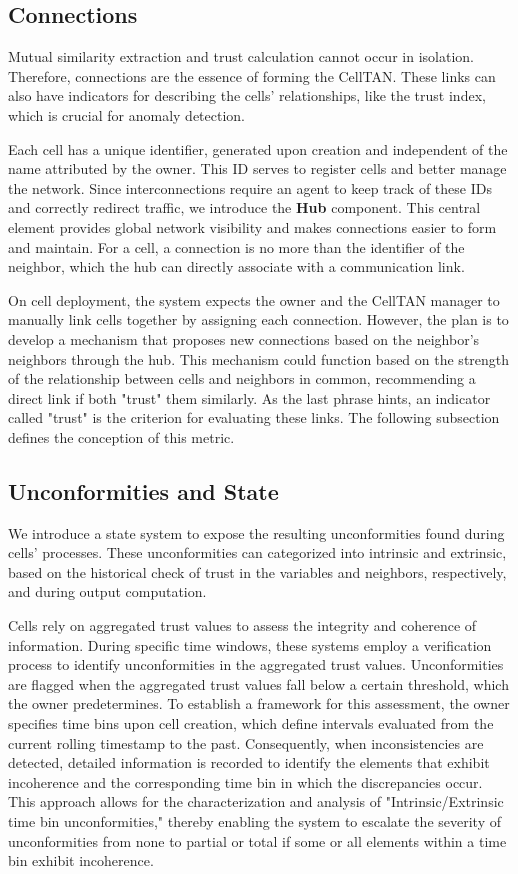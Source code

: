 \subsection{Connections}

Mutual similarity extraction and trust calculation cannot occur in isolation. Therefore, connections are the essence of forming the CellTAN. These links can also have indicators for describing the cells' relationships, like the trust index, which is crucial for anomaly detection.

Each cell has a unique identifier, generated upon creation and independent of the name attributed by the owner. This ID serves to register cells and better manage the network. Since interconnections require an agent to keep track of these IDs and correctly redirect traffic, we introduce the \textbf{Hub} component. This central element provides global network visibility and makes connections easier to form and maintain. For a cell, a connection is no more than the identifier of the neighbor, which the hub can directly associate with a communication link.

On cell deployment, the system expects the owner and the CellTAN manager to manually link cells together by assigning each connection. However, the plan is to develop a mechanism that proposes new connections based on the neighbor's neighbors through the hub. This mechanism could function based on the strength of the relationship between cells and neighbors in common, recommending a direct link if both "trust" them similarly. As the last phrase hints, an indicator called "trust" is the criterion for evaluating these links. The following subsection defines the conception of this metric.

\subsection{Unconformities and State} \label{sec:states}

We introduce a state system to expose the resulting unconformities found during cells' processes. These unconformities can categorized into intrinsic and extrinsic, based on the historical check of trust in the variables and neighbors, respectively, and during output computation.

Cells rely on aggregated trust values to assess the integrity and coherence of information. During specific time windows, these systems employ a verification process to identify unconformities in the aggregated trust values. Unconformities are flagged when the aggregated trust values fall below a certain threshold, which the owner predetermines. To establish a framework for this assessment, the owner specifies time bins upon cell creation, which define intervals evaluated from the current rolling timestamp to the past. Consequently, when inconsistencies are detected, detailed information is recorded to identify the elements that exhibit incoherence and the corresponding time bin in which the discrepancies occur. This approach allows for the characterization and analysis of "Intrinsic/Extrinsic time bin unconformities," thereby enabling the system to escalate the severity of unconformities from none to partial or total if some or all elements within a time bin exhibit incoherence.

